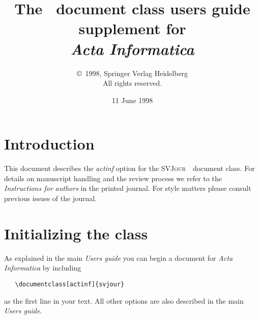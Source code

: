 \documentclass[draft]{ltxguide}[1995/11/28]
\title{The \SJour\ document class users guide\\supplement
for\\\textit{Acta Informatica}}
\author{\copyright~1998, Springer Verlag Heidelberg\\
   All rights reserved.}
\date{11 June 1998}
\newcommand{\SJour}{\textsc{SVJour}}
\begin{document}
\maketitle

\section{Introduction}
\label{sec:intro}
This document describes the \textit{actinf} option for the
\SJour\ \LaTeXe\ document class. For details on
manuscript handling and the review process we refer to the
\emph{Instructions for authors} in the printed journal. For style
matters please consult previous issues of the journal.

\section{Initializing the class}
\label{sec:opt}

As explained in the main \emph{Users guide} you can
begin a document for \emph{Acta Informatica} by including
\begin{verbatim}
   \documentclass[actinf]{svjour}
\end{verbatim}
as the first line in your text. All other options are also described
in the main \emph{Users guide}.
\end{document}
